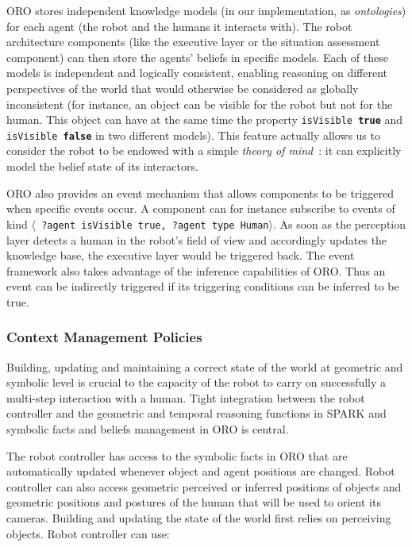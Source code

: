 \documentclass[preprint,5p]{elsarticle}
\newcommand{\concept}[1]{{\small \texttt{#1}}}
\newcommand{\stmt}[1]{{\footnotesize \tt $\langle$ #1\relax$\rangle$}}
\begin{document}
ORO stores independent knowledge models (in our implementation, as
\emph{ontologies}) for each agent (the robot and the humans it
interacts with). The robot architecture components (like the executive
layer or the situation assessment component) can then store the
agents' beliefs in specific models.  Each of these models is
independent and logically consistent, enabling reasoning on different
perspectives of the world that would otherwise be considered as
globally inconsistent (for instance, an object can be visible for the
robot but not for the human. This object can have at the same time the
property \concept{isVisible \textbf{true}} and \concept{isVisible
  \textbf{false}} in two different models). This feature actually
allows us to consider the robot to be endowed with a simple
\emph{theory of mind}~\cite{Scassellati2002}: it can explicitly
model the belief state of its interactors.

ORO also provides an event mechanism that allows components to be
triggered when specific events occur. A component can
for instance subscribe to events of kind \stmt{?agent isVisible
  true, ?agent type Human}. As soon as the perception layer detects a
human in the robot's field of view and accordingly updates the
knowledge base, the executive layer would be triggered back. The
event framework also takes advantage of the inference capabilities of
ORO. Thus an event can be indirectly triggered if its triggering
conditions can be inferred to be true.

\subsubsection{Context Management Policies} 


Building, updating and maintaining a correct state of the world at
geometric and symbolic level is crucial to the capacity of the robot
to carry on successfully a multi-step interaction with a human. Tight
integration between the robot controller and the geometric and
temporal reasoning functions in SPARK and symbolic facts and beliefs
management in ORO is central.
 
The robot controller has access to the symbolic facts in ORO that are
automatically updated whenever object and agent positions are changed.
Robot controller can also access geometric perceived or inferred
positions of objects and geometric positions and postures of the human
that will be used to orient its cameras.  Building and updating the
state of the world first relies on perceiving objects. Robot
controller can use:
\end{document}
